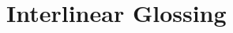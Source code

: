 \documentclass[12pt,paper=a4]{scrartcl}
\newcommand{\xayr}[3]{{\Tagati #1} \emph{#2} \enquote*{#3}}
\begin{document}
\section{Interlinear Glossing}

% 
% 


\vfill
\printbibliography
\end{document}

